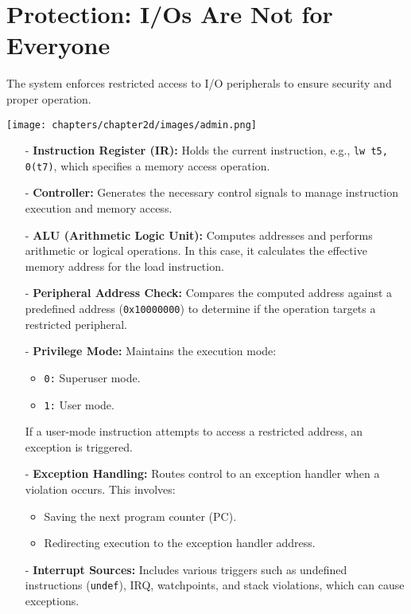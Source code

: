\section{Protection: I/Os Are Not for Everyone}
The system enforces restricted access to I/O peripherals to ensure security and proper operation.
\begin{center}
    \texttt{[image: chapters/chapter2d/images/admin.png]}
\end{center}
\begin{itemize}
    \item[-] \textbf{Instruction Register (IR):} Holds the current instruction, e.g., \texttt{lw t5, 0(t7)}, which specifies a memory access operation.
    \item[-] \textbf{Controller:} Generates the necessary control signals to manage instruction execution and memory access.
    \item[-] \textbf{ALU (Arithmetic Logic Unit):} Computes addresses and performs arithmetic or logical operations. In this case, it calculates the effective memory address for the load instruction.
    \item[-] \textbf{Peripheral Address Check:} Compares the computed address against a predefined address (\texttt{0x10000000}) to determine if the operation targets a restricted peripheral.
    \item[-] \textbf{Privilege Mode:} Maintains the execution mode:
        \begin{itemize}
            \item \texttt{0:} Superuser mode.
            \item \texttt{1:} User mode.
        \end{itemize}
        If a user-mode instruction attempts to access a restricted address, an exception is triggered.
    \item[-] \textbf{Exception Handling:} Routes control to an exception handler when a violation occurs. This involves:
        \begin{itemize}
            \item Saving the next program counter (PC).
            \item Redirecting execution to the exception handler address.
        \end{itemize}
    \item[-] \textbf{Interrupt Sources:} Includes various triggers such as undefined instructions (\texttt{undef}), IRQ, watchpoints, and stack violations, which can cause exceptions.
\end{itemize}

